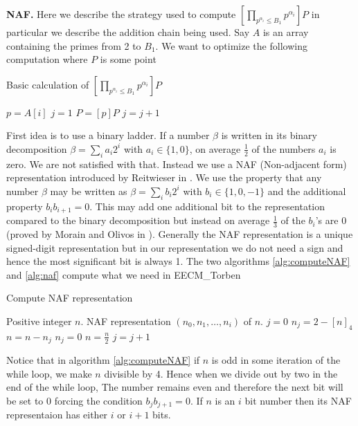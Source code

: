 \textbf{NAF.} Here we describe the strategy used to compute $\left[\prod_{p^{\alpha_i}\leq B_1} p^{\alpha_i}\right]P$ in particular we describe the addition chain being used. Say $A$ is an array containing the primes from 2 to $B_1$. We want to optimize the following computation where $P$ is some point
\begin{algorithm}
\caption{Basic calculation of $\left[\prod_{p^{\alpha_i}\leq B_1} p^{\alpha_i}\right]P$}
\begin{algorithmic}
\label{alg:optimize}
\STATE $p=A[i]$
\STATE $j=1$
\STATE $P=[p]P$
\STATE $j=j+1$
\ENDWHILE
\ENDFOR
\end{algorithmic}
\end{algorithm}
First idea is to use a binary ladder. If a number $\beta$ is written in its binary decomposition $\beta = \sum_{i} a_i2^i$ with $a_i\in \{1,0\}$, on average $\frac{1}{2}$ of the numbers $a_i$ is zero. We are not satisfied with that. Instead we use a NAF (Non-adjacent form) representation introduced by Reitwieser in \cite{reitwiesner:binary}. We use the property that any number $\beta$ may be written as $\beta =\sum_i b_i2^i$ with $b_i\in\{1,0,-1\}$ and the additional property $b_ib_{i+1}=0$. This may add one additional bit to the representation compared to the binary decomposition but instead on average $\frac{1}{3}$ of the $b_i$'s are 0 (proved by Morain and Olivos in \cite{Morain&Olivos:1990}). Generally the NAF representation is a unique signed-digit representation but in our representation we do not need a sign and hence the most significant bit is always 1. The two algorithms \ref{alg:computeNAF} and \ref{alg:naf} compute what we need in EECM\_Torben

\begin{algorithm}
\caption{Compute NAF representation}
\begin{algorithmic}
\label{alg:computeNAF}
\REQUIRE Positive integer $n$.
\ENSURE NAF representation $(n_0,n_1,\ldots,n_i)$ of $n$.
\STATE $j=0$
\STATE $n_j=2-[n]_4$
\STATE $n = n-n_j$
\ELSE
\STATE $n_j=0$
\ENDIF
\STATE $n=\frac{n}{2}$
\STATE $j=j+1$
\ENDWHILE
\end{algorithmic}
\end{algorithm}
Notice that in algorithm \ref{alg:computeNAF} if $n$ is odd in some iteration of the while loop, we make $n$ divisible by 4. Hence when we divide out by two in the end of the while loop, The number remains even and therefore the next bit will be set to 0 forcing the condition $b_jb_{j+1}=0$. If $n$ is an $i$ bit number then its NAF representaion has either $i$ or $i+1$ bits. 

